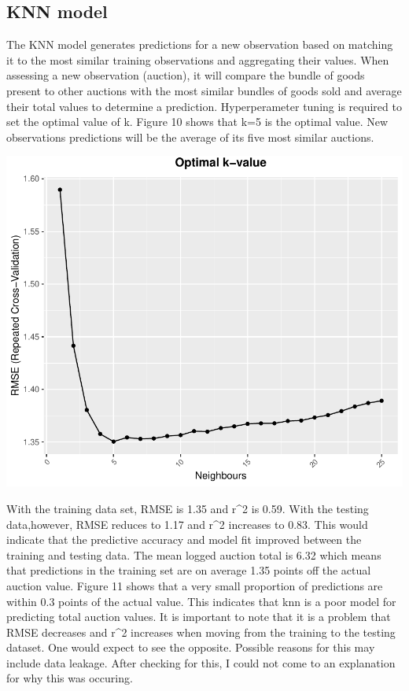\documentclass[11pt,preprint, authoryear]{elsarticle}
\numberwithin{equation}{section}
\numberwithin{figure}{section}
\numberwithin{table}{section}
\begin{document}
\hypertarget{knn-model}{%
\subsection{KNN model}\label{knn-model}}

The KNN model generates predictions for a new observation based on
matching it to the most similar training observations and aggregating
their values. When assessing a new observation (auction), it will
compare the bundle of goods present to other auctions with the most
similar bundles of goods sold and average their total values to
determine a prediction. Hyperperameter tuning is required to set the
optimal value of k. Figure 10 shows that k=5 is the optimal value. New
observations predictions will be the average of its five most similar
auctions.

\includegraphics{Project_write_up_files/figure-latex/Figure10-1.pdf}

With the training data set, RMSE is 1.35 and r\^{}2 is 0.59. With the
testing data,however, RMSE reduces to 1.17 and r\^{}2 increases to 0.83.
This would indicate that the predictive accuracy and model fit improved
between the training and testing data. The mean logged auction total is
6.32 which means that predictions in the training set are on average
1.35 points off the actual auction value. Figure 11 shows that a very
small proportion of predictions are within 0.3 points of the actual
value. This indicates that knn is a poor model for predicting total
auction values. It is important to note that it is a problem that RMSE
decreases and r\^{}2 increases when moving from the training to the
testing dataset. One would expect to see the opposite. Possible reasons
for this may include data leakage. After checking for this, I could not
come to an explanation for why this was occuring.
\end{document}
